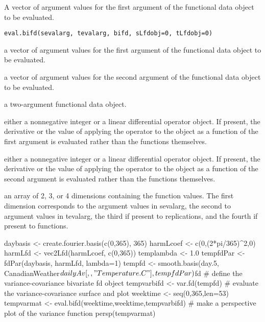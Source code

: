 \begin{Description}\relax
A vector of argument values for the first argument  of the
functional data object to be evaluated.
\end{Description}
\begin{Usage}
\begin{verbatim}
eval.bifd(sevalarg, tevalarg, bifd, sLfdobj=0, tLfdobj=0)
\end{verbatim}
\end{Usage}
\begin{Arguments}
\begin{ldescription}
\item[\code{sevalarg}] a vector of argument values for the first argument  of the 
functional data object to be evaluated.

\item[\code{tevalarg}] a vector of argument values for the second argument  of the 
functional data object to be evaluated.

\item[\code{bifd}] a two-argument functional data object.

\item[\code{sLfdobj}] either a nonnegative integer or a linear differential operator
object.  If present, the derivative or the value of applying the
operator to the object as a function of the first argument 
is evaluated rather than the functions themselves.

\item[\code{tLfdobj}] either a nonnegative integer or a linear differential operator
object.  If present, the derivative or the value of applying the
operator to the object as a function of the second argument 
is evaluated rather than the functions themselves.

\end{ldescription}
\end{Arguments}
\begin{Value}
an array of 2, 3, or 4 dimensions containing the function values.  The
first dimension corresponds to the argument values in sevalarg, the
second to argument values in tevalarg, the third if present to
replications, and the fourth if present to functions.
\end{Value}
\begin{Examples}
\begin{ExampleCode}
daybasis   <- create.fourier.basis(c(0,365), 365)
harmLcoef  <- c(0,(2*pi/365)^2,0)
harmLfd    <- vec2Lfd(harmLcoef, c(0,365))
templambda <- 1.0
tempfdPar  <- fdPar(daybasis, harmLfd, lambda=1)
tempfd     <- smooth.basis(day.5,
          CanadianWeather$dailyAv[,,"Temperature.C"], tempfdPar)$fd
#    define the variance-covariance bivariate fd object
tempvarbifd <- var.fd(tempfd)
#    evaluate the variance-covariance surface and plot
weektime    <- seq(0,365,len=53)
tempvarmat  <- eval.bifd(weektime,weektime,tempvarbifd)
#    make a perspective plot of the variance function
persp(tempvarmat)
\end{ExampleCode}
\end{Examples}

